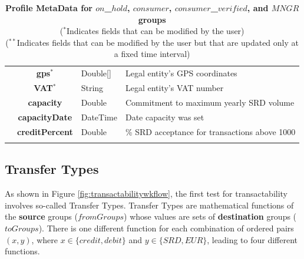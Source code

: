 \begin{table}[H]
\begin{centering}
{\begin{tabular}{ r | c | l | l }
			& {\bf gps}$^*$				&Double[]	& Legal entity's GPS coordinates \\
			& {\bf VAT}$^*$				&String	& Legal entity's VAT number \\
			& {\bf capacity}				&Double	& Commitment to maximum yearly SRD volume \\
			& {\bf capacityDate}			&DateTime & Date capacity was set \\
			& {\bf creditPercent}			&Double	& \% SRD acceptance for transactions above 1000 \\
\Xhline{1.5pt}
\end{tabular}
}
\caption{\small\textbf{Profile MetaData for $on$\_$hold$, $consumer$, $consumer$\_$verified$, and $MNGR$ groups}\\
($^*$Indicates fields that can be modified by the user)\\
($^{**}$Indicates fields that can be modified by the user but that are updated only at a fixed time interval)
}
\label{tab:ProfileMetaData2}
\end{centering}
\vspace{-1.5cm}
\end{table}

\subsection{Transfer Types}
As shown in Figure \ref{fig:transactabilitywkflow}, the first test for transactability involves so-called Transfer Types. Transfer Types are mathematical functions of the {\bf source} groups ($fromGroups$) whose values are sets of {\bf destination} groups ($toGroups$). There is one different function for each combination of ordered pairs $(x, y)$, where $x \in \{ credit, debit \}$ and $y \in \{ SRD, EUR \}$, leading to four different functions.

